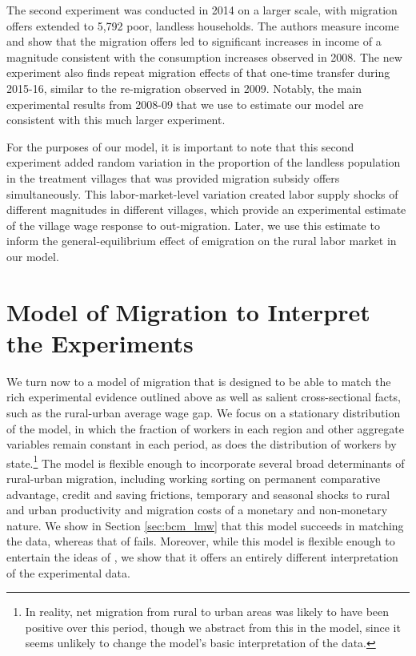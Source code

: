\documentclass[12pt,pdftex]{article}
\begin{document}
The second experiment \citep{akch17} was conducted in 2014 on a larger scale, with migration offers extended to 5,792 poor, landless households. The authors measure income and show that the migration offers led to significant increases in income of a magnitude consistent with the consumption increases observed in 2008. The new experiment also finds repeat migration effects of that one-time transfer during 2015-16, similar to the re-migration observed in 2009. Notably, the main experimental results from 2008-09 that we use to estimate our model are consistent with this much larger experiment.

For the purposes of our model, it is important to note that this second experiment added random variation in the proportion of the landless population in the treatment villages that was provided migration subsidy offers simultaneously. This labor-market-level variation created labor supply shocks of different magnitudes in different villages, which provide an experimental estimate of the village wage response to out-migration. Later, we use this estimate to inform the general-equilibrium effect of emigration on the rural labor market in our model.

\section{Model of Migration to Interpret the Experiments}\label{sec:quant_model}

We turn now to a model of migration that is designed to be able to match the rich experimental evidence outlined above as well as salient cross-sectional facts, such as the rural-urban average wage gap. We focus on a stationary distribution of the model, in which the fraction of workers in each region and other aggregate variables remain constant in each period, as does the distribution of workers by state.\footnote{In reality, net migration from rural to urban areas was likely to have been positive over this period, though we abstract from this in the model, since it seems unlikely to change the model's basic interpretation of the data.} The model is flexible enough to incorporate several broad determinants of rural-urban migration, including working sorting on permanent comparative advantage, credit and saving frictions, temporary and seasonal shocks to rural and urban productivity and migration costs of a monetary and non-monetary nature. We show in Section \ref{sec:bcm_lmw} that this model succeeds in matching the data, whereas that of \citet{brch14} fails. Moreover, while this model is flexible enough to entertain the ideas of \citet{brch14}, we show that it offers an entirely different interpretation of the experimental data.
\end{document}
